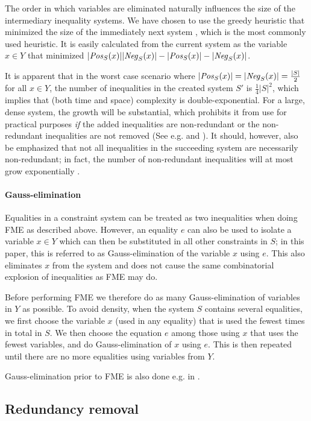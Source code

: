The order in which variables are eliminated naturally influences the size of the intermediary inequality systems. We have chosen to use the greedy heuristic that minimized the size of the immediately next system \cite{duffin74}, which is the most commonly used heuristic. It is easily calculated from the current system as the variable $x\in Y$ that minimized $|\mathit{Pos}_S(x)||\mathit{Neg}_S(x)| - |\mathit{Pos}_S(x)|-|\mathit{Neg}_S(x)|$. 


It is apparent that in the worst case scenario where $|\mathit{Pos}_S(x)| = |\mathit{Neg}_S(x)| = \frac{|S|}{2}$ for all $x\in Y$, the number of inequalities in the created system $S'$ is $\frac{1}{4}|S|^2$, which implies that (both time and space) complexity is double-exponential. For a large, dense system, the growth will be substantial, which prohibits it from use for practical purposes \emph{if} the added inequalities are non-redundant or the non-redundant inequalities are not removed ({See e.g. \cite{lassez93} and \cite{lukatskii08}}). It should, however, also be emphasized that not all inequalities in the succeeding system are necessarily non-redundant; in fact, the number of non-redundant inequalities will at most grow exponentially \cite{monniaux10}.

\paragraph{Gauss-elimination}
Equalities in a constraint system can be treated as two inequalities when doing FME as described above. However, an equality $e$ can also be used to isolate a variable $x\in Y$ which can then be substituted in all other constraints in $S$; in this paper, this is referred to as Gauss-elimination of the variable $x$ using $e$. This also eliminates $x$ from the system and does not cause the same combinatorial explosion of inequalities as FME may do. 

Before performing FME we therefore do as many Gauss-elimination of variables in $Y$ as possible.
%
To avoid density, when the system $S$ contains several equalities, we first choose the variable $x$ (used in any equality) that is used the fewest times in total in $S$. We then choose the equation $e$ among those using $x$ that uses the fewest variables, and do Gauss-elimination of $x$ using $e$. 
This is then repeated until there are no more equalities using variables from $Y$.

Gauss-elimination prior to FME is also done e.g. in \cite{simon05}.
 
\subsection{Redundancy removal}
